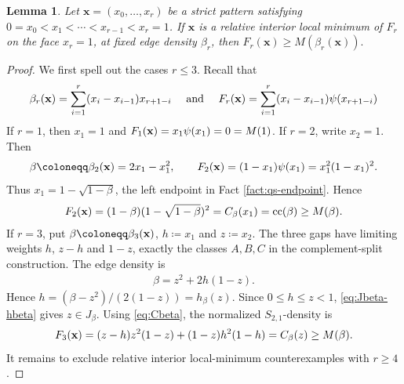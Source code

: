 \documentclass[10pt,a4paper]{article}
\newtheorem{lemma}[definition]{Lemma}
\newcommand{\cc}{\operatorname{cc}}
\begin{document}
\begin{lemma}\label{lem:no-interior-xreq1}
Let $\mathbf{x}=(x_0,\ldots,x_r)$ be a strict pattern satisfying $0=x_0<x_1<\cdots<x_{r-1}<x_r=1$.  If $\mathbf{x}$ is a relative interior local minimum of $F_r$ on the face $x_r=1$, at fixed edge density $\beta_r$, then
$
  F_r(\mathbf{x})\ge M(\beta_r(\mathbf{x})).
$
\end{lemma}

\begin{proof}
We first spell out the cases $r\le3$.  Recall that 
\begin{align*}
  \beta_r({\bf x})=\sum_{i=1}^{r}(x_i-x_{i-1})x_{r+1-i}\quad\text{ and }\quad F_r({\bf x})=\sum_{i=1}^{r}(x_i-x_{i-1})\psi(x_{r+1-i})
\end{align*}If $r=1$, then $x_1=1$ and $F_1({\bf x})=x_1\psi(x_1)=0=M(1)$.  If $r=2$, write $x_2=1$.  Then
\begin{align*}
  \beta\coloneqq\beta_2({\bf x})=2x_1-x_1^2,
  \qquad
  F_2({\bf x})=(1-x_1)\psi(x_1)=x_1^2(1-x_1)^2.
\end{align*}
Thus $x_1=1-\sqrt{1-\beta}$, the left endpoint in Fact \ref{fact:qs-endpoint}.  Hence
\begin{align*}
  F_2({\bf x})=(1-\beta)(1-\sqrt{1-\beta})^2=C_\beta(x_1)=\cc(\beta)\ge M(\beta).
\end{align*}
If $r=3$, put $\beta\coloneqq\beta_3({\bf x})$, $h\coloneqq x_1$ and
$z\coloneqq x_2$.  The three gaps have limiting weights $h$, $z-h$ and
$1-z$, exactly the classes $A,B,C$ in the complement-split construction.  The
edge density is
\begin{align*}
  \beta=z^2+2h(1-z).
\end{align*}
Hence $h=(\beta-z^2)/(2(1-z))=h_\beta(z)$.  Since $0\le h\le z<1$,
\eqref{eq:Jbeta-hbeta} gives $z\in J_\beta$.  Using \eqref{eq:Cbeta}, the
normalized $S_{2,1}$-density is
\begin{align*}
  F_3({\bf x})=(z-h)z^2(1-z)+(1-z)h^2(1-h)=C_\beta(z)\ge M(\beta).
\end{align*}
It remains to exclude relative interior local-minimum counterexamples with $r\ge4$.


\end{proof}
\end{document}
